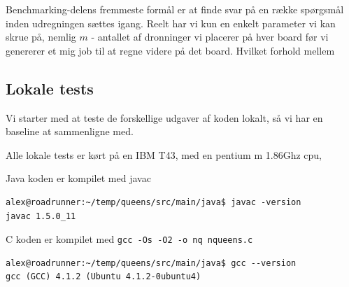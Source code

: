 Benchmarking-delens fremmeste formål er at finde svar på en række spørgsmål
inden udregningen sættes igang.  Reelt har vi kun en enkelt parameter vi kan
skrue på, nemlig $m$ - antallet af dronninger vi placerer på hver board før vi
genererer et mig job til at regne videre på det board.  Hvilket forhold mellem 

\subsection{Lokale tests}

Vi starter med at teste de forskellige udgaver af koden lokalt, så vi har en
baseline at sammenligne med.

Alle lokale tests er kørt på en IBM T43, med en pentium m 1.86Ghz cpu, 

Java koden er kompilet med javac

\begin{verbatim}
alex@roadrunner:~/temp/queens/src/main/java$ javac -version
javac 1.5.0_11
\end{verbatim}

C koden er kompilet med \texttt{gcc -Os -O2 -o nq nqueens.c}

\begin{verbatim}
alex@roadrunner:~/temp/queens/src/main/java$ gcc --version
gcc (GCC) 4.1.2 (Ubuntu 4.1.2-0ubuntu4)
\end{verbatim}

